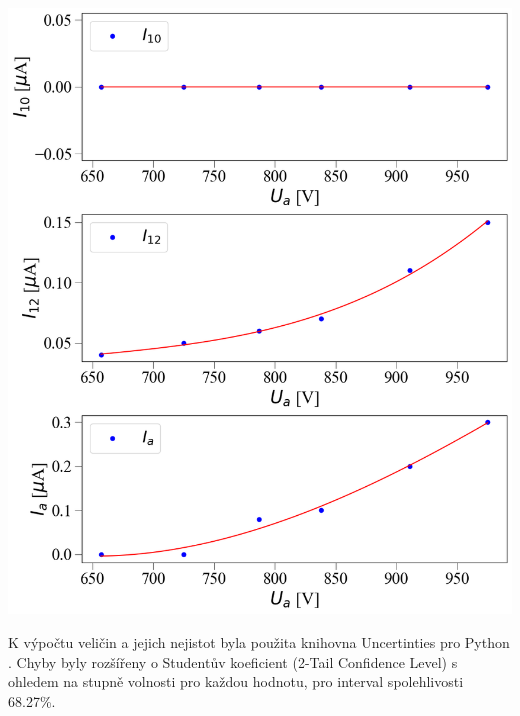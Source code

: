 \documentclass[a4paper,11pt]{article}
\begin{document}
    \begin{minipage}[t]{0.5\textwidth}
                \vspace{0pt}   
                \par \centering
                \includegraphics[scale=0.33]{dc}
                \captionsetup{justification=centering, font=footnotesize}
                \label{fig:dc}
                \vspace{10pt}
                \raggedright 
    \end{minipage}
                \vspace{10pt}
                \par K výpočtu veličin a jejich nejistot byla použita knihovna Uncertinties pro Python \cite{uncertainties}. Chyby byly rozšířeny o Studentův koeficient (2-Tail Confidence Level) s ohledem na stupně volnosti pro každou hodnotu, pro interval spolehlivosti 68.27\%.
\end{document}
